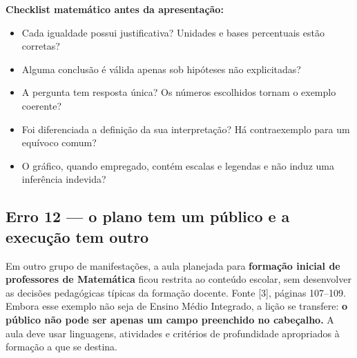 \documentclass[11pt,a4paper]{article}
\begin{document}
\textbf{Checklist matemático antes da apresentação:}
\begin{itemize}
\item Cada igualdade possui justificativa? Unidades e bases percentuais estão corretas?
\item Alguma conclusão é válida apenas sob hipóteses não explicitadas?
\item A pergunta tem resposta única? Os números escolhidos tornam o exemplo coerente?
\item Foi diferenciada a definição da sua interpretação? Há contraexemplo para um equívoco comum?
\item O gráfico, quando empregado, contém escalas e legendas e não induz uma inferência indevida?
\end{itemize}

\subsection{Erro 12 --- o plano tem um público e a execução tem outro}
Em outro grupo de manifestações, a aula planejada para \textbf{formação inicial de professores de Matemática} ficou restrita ao conteúdo escolar, sem desenvolver as decisões pedagógicas típicas da formação docente. Fonte [3], páginas 107--109. Embora esse exemplo não seja de Ensino Médio Integrado, a lição se transfere: \textbf{o público não pode ser apenas um campo preenchido no cabeçalho.} A aula deve usar linguagens, atividades e critérios de profundidade apropriados à formação a que se destina.
\end{document}
